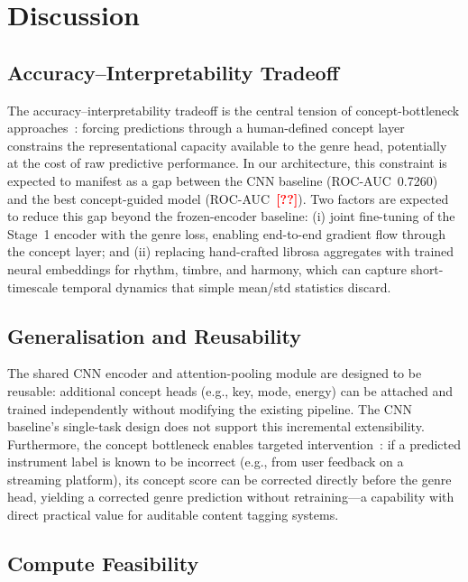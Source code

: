 \documentclass[sigconf,nonacm]{acmart}
\newcommand{\res}[1]{\textcolor{red}{\textbf{[#1]}}}
\begin{document}
\section{Discussion}

\subsection{Accuracy--Interpretability Tradeoff}

The accuracy--interpretability tradeoff is the central tension of concept-bottleneck
approaches~\cite{koh2020concept}: forcing predictions through a human-defined concept layer
constrains the representational capacity available to the genre head, potentially at the cost of
raw predictive performance. In our architecture, this constraint is expected to manifest as a
gap between the CNN baseline (ROC-AUC~0.7260) and the best concept-guided model
(ROC-AUC~\res{??}). Two factors are expected to reduce this gap beyond the frozen-encoder
baseline: (i) joint fine-tuning of the Stage~1 encoder with the genre loss, enabling
end-to-end gradient flow through the concept layer; and (ii) replacing hand-crafted librosa
aggregates with trained neural embeddings for rhythm, timbre, and harmony, which can capture
short-timescale temporal dynamics that simple mean/std statistics discard.

\subsection{Generalisation and Reusability}

The shared CNN encoder and attention-pooling module are designed to be reusable: additional
concept heads (e.g., key, mode, energy) can be attached and trained independently without
modifying the existing pipeline. The CNN baseline's single-task design does not support this
incremental extensibility. Furthermore, the concept bottleneck enables targeted
intervention~\cite{koh2020concept}: if a predicted instrument label is known to be incorrect
(e.g., from user feedback on a streaming platform), its concept score can be corrected directly
before the genre head, yielding a corrected genre prediction without retraining---a capability
with direct practical value for auditable content tagging systems.

\subsection{Compute Feasibility}
\end{document}
